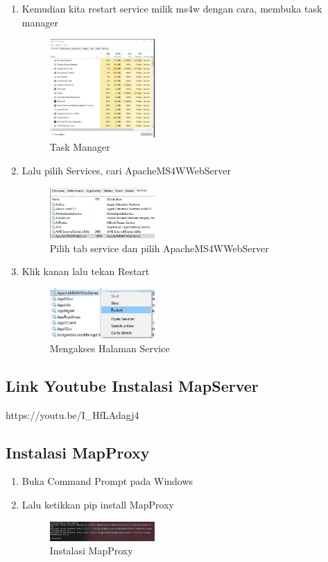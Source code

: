 \begin{enumerate}
  \item Kemudian kita restart service milik ms4w dengan cara, membuka task manager
  \hfill\break
    \begin{figure}[H]
		\includegraphics[width=4cm]{figures/tugas4/1174066/6.jpg}
		\centering
		\caption{Task Manager}
    \end{figure}

  \item Lalu pilih Services, cari ApacheMS4WWebServer
  \hfill\break
  \begin{figure}[H]
  \includegraphics[width=4cm]{figures/tugas4/1174066/7.jpg}
  \centering
  \caption{Pilih tab service dan pilih ApacheMS4WWebServer}
  \end{figure}

  \item Klik kanan lalu tekan Restart
  \hfill\break
    \begin{figure}[H]
		\includegraphics[width=4cm]{figures/tugas4/1174066/8.jpg}
		\centering
		\caption{Mengakses Halaman Service}
    \end{figure}
\end{enumerate}

\subsection{Link Youtube Instalasi MapServer}
https://youtu.be/I\_HfLAdagj4

\subsection{Instalasi MapProxy}
\begin{enumerate}
  \item Buka Command Prompt pada Windows
  \item Lalu ketikkan pip install MapProxy
  \hfill\break
  \begin{figure}[H]
  \includegraphics[width=4cm]{figures/tugas4/1174066/9.jpg}
  \centering
  \caption{Instalasi MapProxy}
  \end{figure}
\end{enumerate}

